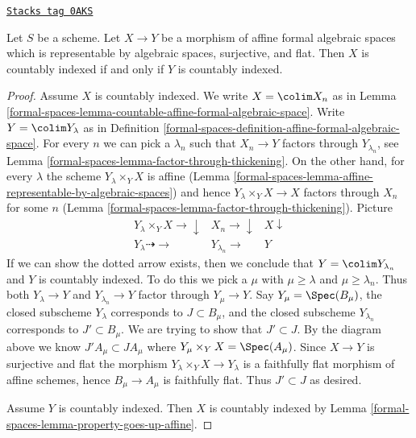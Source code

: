\begin{lemma}
\label{formal-spaces-lemma-iff-countably-indexed}
\href{https://stacks.math.columbia.edu/tag/0AKS}{\texttt{Stacks tag 0AKS}}

Let $S$ be a scheme. Let $X \to Y$ be a morphism of affine
formal algebraic spaces which is representable by algebraic spaces,
surjective, and flat. Then $X$ is countably indexed if and only
if $Y$ is countably indexed.
\end{lemma}

\begin{proof}
Assume $X$ is countably indexed. We write $X = \colim X_n$ as in
Lemma \ref{formal-spaces-lemma-countable-affine-formal-algebraic-space}.
Write $Y = \colim Y_\lambda$ as in
Definition \ref{formal-spaces-definition-affine-formal-algebraic-space}.
For every $n$ we can pick a $\lambda_n$ such that
$X_n \to Y$ factors through $Y_{\lambda_n}$, see
Lemma \ref{formal-spaces-lemma-factor-through-thickening}.
On the other hand, for every $\lambda$ the scheme
$Y_\lambda \times_Y X$ is affine
(Lemma \ref{formal-spaces-lemma-affine-representable-by-algebraic-spaces})
and hence $Y_\lambda \times_Y X \to X$ factors through
$X_n$ for some $n$ (Lemma \ref{formal-spaces-lemma-factor-through-thickening}).
Picture
$$
\begin{array}{ccc}Y_\lambda \times_Y X \longrightarrow\downarrow & X_n \longrightarrow\downarrow & X \downarrow \\ Y_\lambda \dashrightarrow\longrightarrow & Y_{\lambda_n} \longrightarrow & Y\end{array}
$$
If we can show the dotted arrow exists, then we conclude that
$Y = \colim Y_{\lambda_n}$ and $Y$ is countably indexed. To do this we
pick a $\mu$ with $\mu \geq \lambda$ and $\mu \geq \lambda_n$.
Thus both $Y_\lambda \to Y$ and $Y_{\lambda_n} \to Y$ factor
through $Y_\mu \to Y$.
Say $Y_\mu = \Spec(B_\mu)$, the closed subscheme $Y_\lambda$ corresponds to
$J \subset B_\mu$, and the closed subscheme $Y_{\lambda_n}$ corresponds to
$J' \subset B_\mu$. We are trying to show that $J' \subset J$.
By the diagram above we know $J'A_\mu \subset JA_\mu$
where $Y_\mu \times_Y X = \Spec(A_\mu)$.
Since $X \to Y$ is surjective and flat the morphism
$Y_\lambda \times_Y X \to Y_\lambda$ is a faithfully flat morphism
of affine schemes, hence $B_\mu \to A_\mu$ is
faithfully flat. Thus $J' \subset J$ as desired.

\medskip\noindent
Assume $Y$ is countably indexed. Then $X$ is countably indexed
by Lemma \ref{formal-spaces-lemma-property-goes-up-affine}.
\end{proof}

